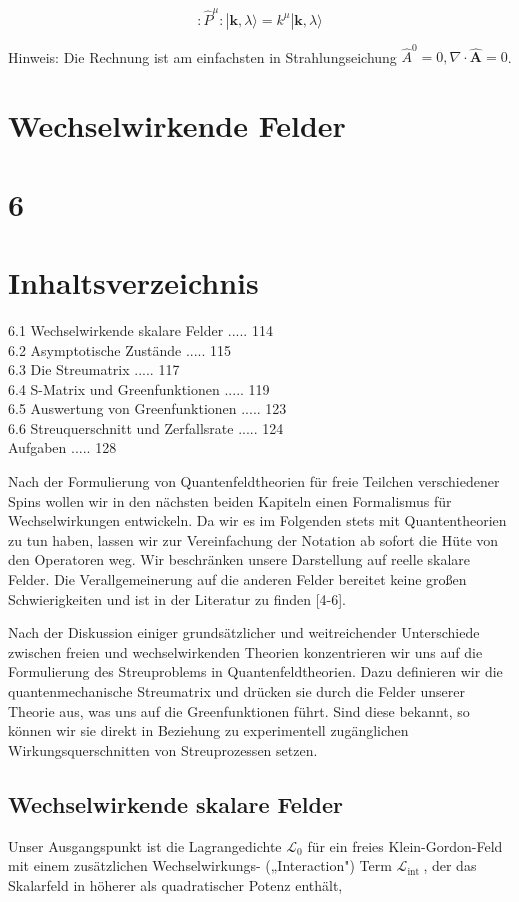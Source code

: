 \documentclass[10pt, letterpaper]{article}
\begin{document}
$$
: \hat{P}^{\mu}:|\mathbf{k}, \lambda\rangle=k^{\mu}|\mathbf{k}, \lambda\rangle
$$

Hinweis: Die Rechnung ist am einfachsten in Strahlungseichung $\hat{A}^{0}=0, \nabla \cdot \hat{\mathbf{A}}=0$.

\section*{Wechselwirkende Felder}
\section*{6}
\section*{Inhaltsverzeichnis}
6.1 Wechselwirkende skalare Felder ..... 114\\
6.2 Asymptotische Zustände ..... 115\\
6.3 Die Streumatrix ..... 117\\
6.4 S-Matrix und Greenfunktionen ..... 119\\
6.5 Auswertung von Greenfunktionen ..... 123\\
6.6 Streuquerschnitt und Zerfallsrate ..... 124\\
Aufgaben ..... 128

Nach der Formulierung von Quantenfeldtheorien für freie Teilchen verschiedener Spins wollen wir in den nächsten beiden Kapiteln einen Formalismus für Wechselwirkungen entwickeln. Da wir es im Folgenden stets mit Quantentheorien zu tun haben, lassen wir zur Vereinfachung der Notation ab sofort die Hüte von den Operatoren weg. Wir beschränken unsere Darstellung auf reelle skalare Felder. Die Verallgemeinerung auf die anderen Felder bereitet keine großen Schwierigkeiten und ist in der Literatur zu finden [4-6].

Nach der Diskussion einiger grundsätzlicher und weitreichender Unterschiede zwischen freien und wechselwirkenden Theorien konzentrieren wir uns auf die Formulierung des Streuproblems in Quantenfeldtheorien. Dazu definieren wir die quantenmechanische Streumatrix und drücken sie durch die Felder unserer Theorie aus, was uns auf die Greenfunktionen führt. Sind diese bekannt, so können wir sie direkt in Beziehung zu experimentell zugänglichen Wirkungsquerschnitten von Streuprozessen setzen.

\subsection*{Wechselwirkende skalare Felder}
Unser Ausgangspunkt ist die Lagrangedichte $\mathscr{L}_{0}$ für ein freies Klein-Gordon-Feld mit einem zusätzlichen Wechselwirkungs- („Interaction") Term $\mathscr{L}_{\text {int }}$, der das Skalarfeld in höherer als quadratischer Potenz enthält,
\end{document}
